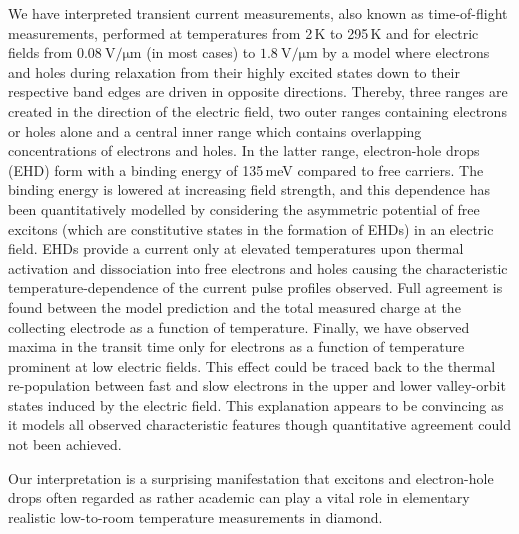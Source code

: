 
We have interpreted transient current measurements, also known as time-of-flight measurements, 
 performed at temperatures from 2\,K to 295\,K and for electric fields from $\SI{0.08}{\volt/\um}$ (in most cases) to $\SI{1.8}{\volt/\um}$
 by a model where electrons and holes during relaxation from their highly excited states down to their respective band edges are driven in opposite directions. 
Thereby, three ranges are created in the direction of the electric field, two outer ranges containing electrons or holes alone and a central inner range which contains 
overlapping concentrations of electrons and holes. 
In the latter range, electron-hole drops (EHD) form with a binding energy of 135\,meV compared to free carriers. 
The binding energy is lowered at increasing field strength, and this dependence has been quantitatively modelled by considering the asymmetric potential of free excitons
 (which are constitutive states in the formation of EHDs) in an electric field. 
EHDs provide a current only at elevated temperatures upon thermal activation and dissociation into free electrons and holes causing the characteristic temperature-dependence of the current pulse profiles observed. 
Full agreement is found between the model prediction and the total measured charge at the collecting electrode as a function of temperature. 
Finally, we have observed maxima in the transit time only for electrons as a function of temperature prominent at low electric fields. 
This effect could be traced back to the thermal re-population between fast and slow electrons in the upper and lower valley-orbit states induced by the electric field. 
This explanation appears to be convincing as it models all observed characteristic features though quantitative agreement could not been achieved.

Our interpretation is a surprising manifestation that excitons and electron-hole drops often regarded as rather academic can play a vital role in elementary realistic low-to-room temperature measurements in diamond.
